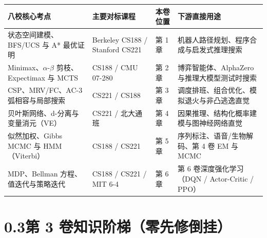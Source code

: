 \begin{center}
\footnotesize
\begin{tabularx}{\linewidth}{@{}p{34mm}p{34mm}p{16mm}X@{}}
\toprule
\textbf{八校核心考点} & \textbf{主要对标课程} & \textbf{本卷位置} & \textbf{下游直接用途} \\
\midrule
状态空间建模、BFS/UCS 与 A* 最优证明 & Berkeley CS188 / Stanford CS221 & 第 1 章 & 机器人路径规划、程序合成与启发式推理搜索 \\
Minimax、$\alpha$-$\beta$ 剪枝、Expectimax 与 MCTS & CS188 / CMU 07-280 & 第 2 章 & 博弈智能体、AlphaZero 与推理大模型测试时搜索 \\
CSP、MRV/FC、AC-3 弧相容与局部搜索 & CS221 / CS188 & 第 3 章 & 调度排班、组合优化、模拟退火与非凸逃逸直觉 \\
贝叶斯网络、d-分离与变量消元（VE） & CS221 / 北大通班 & 第 4 章 & 因果推理、结构化概率建模与图神经网络直觉 \\
似然加权、Gibbs MCMC 与 HMM（Viterbi） & CS188 / CS221 & 第 5 章 & 序列标注、语音/生物解码、第 4 卷 EM 与 MCMC \\
MDP、Bellman 方程、值迭代与策略迭代 & CS188 / CS221 / MIT 6-4 & 第 6 章 & 第 6 卷深度强化学习（DQN / Actor-Critic / PPO） \\
\bottomrule
\end{tabularx}
\end{center}

\section*{0.3\quad 第 3 卷知识阶梯（零先修倒挂）}

